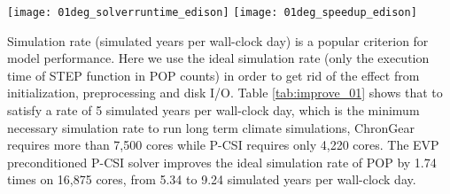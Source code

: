 \begin {figure*}[t!]
\begin{center}
\texttt{[image: 01deg\_solverruntime\_edison]}
\hspace{10pt}
\texttt{[image: 01deg\_speedup\_edison]}
\end{center}
\caption []{Execution time of barotropic solvers in the 0.1\degree POP for one day on Edison (left). 
The relative speedup of the whole POP model referred to the original configuration with a diagonal preconditioned ChronGear solver on 470 cores on Edison (right).\label {fig:runtime01_edison}}
\end {figure*}

Simulation rate (simulated years per wall-clock day) is a popular criterion for model performance. 
Here we use the ideal simulation rate (only the execution time of STEP function in POP counts) in order to get rid of the effect from initialization, preprocessing  and disk I/O. 
Table \ref{tab:improve_01} shows that to satisfy a rate of 5 simulated years per wall-clock day, which is the minimum necessary simulation rate to run long term climate simulations, 
ChronGear requires more than 7,500 cores while P-CSI requires only 4,220 cores. 
The EVP preconditioned P-CSI solver improves the ideal simulation rate of POP by 1.74 times on 16,875 cores, from 5.34 to 9.24 simulated years per wall-clock day. 


